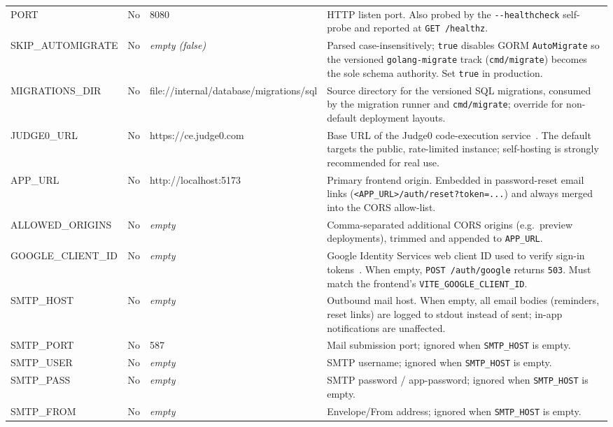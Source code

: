 \begin{center}
\begin{xltabular}{\linewidth}{>{\ttfamily\small}p{3.5cm} c >{\ttfamily\footnotesize}p{2.9cm} X}
  PORT & No & 8080 & HTTP listen port. Also probed by the \texttt{-{}-healthcheck} self-probe and reported at \texttt{GET /healthz}. \\

  SKIP\_AUTOMIGRATE & No & \normalfont\itshape empty (false) &
  Parsed case-insensitively; \texttt{true} disables GORM \texttt{AutoMigrate} so the versioned \texttt{golang-migrate} track (\texttt{cmd/migrate}) becomes the sole schema authority. Set \texttt{true} in production. \\

  MIGRATIONS\_DIR & No & \normalfont\ttfamily\scriptsize file://internal/database/\allowbreak migrations/sql &
  Source directory for the versioned SQL migrations, consumed by the migration runner and \texttt{cmd/migrate}; override for non-default deployment layouts. \\

  JUDGE0\_URL & No & \normalfont\ttfamily\scriptsize https://ce.judge0.com &
  Base URL of the Judge0 code-execution service~\cite{judge0}. The default targets the public, rate-limited instance; self-hosting is strongly recommended for real use. \\

  APP\_URL & No & \normalfont\ttfamily\scriptsize http://localhost:5173 &
  Primary frontend origin. Embedded in password-reset email links (\texttt{<APP\_URL>/auth/reset?token=...}) and always merged into the CORS allow-list. \\

  ALLOWED\_ORIGINS & No & \normalfont\itshape empty &
  Comma-separated additional CORS origins (e.g.\ preview deployments), trimmed and appended to \texttt{APP\_URL}. \\

  GOOGLE\_CLIENT\_ID & No & \normalfont\itshape empty &
  Google Identity Services web client ID used to verify sign-in tokens~\cite{oidc-core}. When empty, \texttt{POST /auth/google} returns \texttt{503}. Must match the frontend's \texttt{VITE\_GOOGLE\_CLIENT\_ID}. \\

  SMTP\_HOST & No & \normalfont\itshape empty &
  Outbound mail host. When empty, all email bodies (reminders, reset links) are logged to stdout instead of sent; in-app notifications are unaffected. \\
  SMTP\_PORT & No & 587 & Mail submission port; ignored when \texttt{SMTP\_HOST} is empty. \\
  SMTP\_USER & No & \normalfont\itshape empty & SMTP username; ignored when \texttt{SMTP\_HOST} is empty. \\
  SMTP\_PASS & No & \normalfont\itshape empty & SMTP password / app-password; ignored when \texttt{SMTP\_HOST} is empty. \\
  SMTP\_FROM & No & \normalfont\itshape empty & Envelope/From address; ignored when \texttt{SMTP\_HOST} is empty. \\
\end{xltabular}
\end{center}

